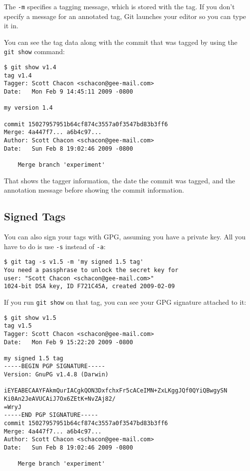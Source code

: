 \documentclass[a4paper]{book}
\begin{document}
The \texttt{-m} specifies a tagging message, which is stored with the tag. If you don't specify a message for an annotated tag, Git launches your editor so you can type it in.

You can see the tag data along with the commit that was tagged by using the \texttt{git show} command:

\begin{shaded}\begin{verbatim}
$ git show v1.4
tag v1.4
Tagger: Scott Chacon <schacon@gee-mail.com>
Date:   Mon Feb 9 14:45:11 2009 -0800

my version 1.4

commit 15027957951b64cf874c3557a0f3547bd83b3ff6
Merge: 4a447f7... a6b4c97...
Author: Scott Chacon <schacon@gee-mail.com>
Date:   Sun Feb 8 19:02:46 2009 -0800

    Merge branch 'experiment'
\end{verbatim}\end{shaded}

That shows the tagger information, the date the commit was tagged, and the annotation message before showing the commit information.

\subsection{Signed Tags}\label{signed-tags}

You can also sign your tags with GPG, assuming you have a private key. All you have to do is use \texttt{-s} instead of \texttt{-a}:

\begin{shaded}\begin{verbatim}
$ git tag -s v1.5 -m 'my signed 1.5 tag'
You need a passphrase to unlock the secret key for
user: "Scott Chacon <schacon@gee-mail.com>"
1024-bit DSA key, ID F721C45A, created 2009-02-09
\end{verbatim}\end{shaded}

If you run \texttt{git show} on that tag, you can see your GPG signature attached to it:

\begin{shaded}\begin{verbatim}
$ git show v1.5
tag v1.5
Tagger: Scott Chacon <schacon@gee-mail.com>
Date:   Mon Feb 9 15:22:20 2009 -0800

my signed 1.5 tag
-----BEGIN PGP SIGNATURE-----
Version: GnuPG v1.4.8 (Darwin)

iEYEABECAAYFAkmQurIACgkQON3DxfchxFr5cACeIMN+ZxLKggJQf0QYiQBwgySN
Ki0An2JeAVUCAiJ7Ox6ZEtK+NvZAj82/
=WryJ
-----END PGP SIGNATURE-----
commit 15027957951b64cf874c3557a0f3547bd83b3ff6
Merge: 4a447f7... a6b4c97...
Author: Scott Chacon <schacon@gee-mail.com>
Date:   Sun Feb 8 19:02:46 2009 -0800

    Merge branch 'experiment'
\end{verbatim}\end{shaded}
\end{document}

